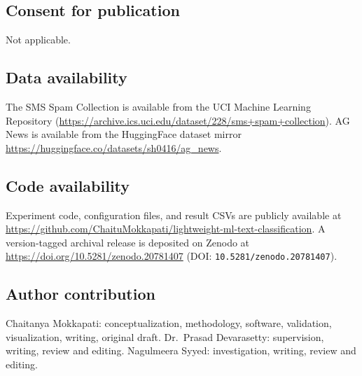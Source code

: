 \documentclass[pdflatex,sn-mathphys-num]{sn-jnl}
\begin{document}
\subsection*{Consent for publication}
Not applicable.

\subsection*{Data availability}
The SMS Spam Collection is available from the UCI Machine Learning Repository (\url{https://archive.ics.uci.edu/dataset/228/sms+spam+collection}). AG News is available from the HuggingFace dataset mirror \url{https://huggingface.co/datasets/sh0416/ag_news}.

\subsection*{Code availability}
Experiment code, configuration files, and result CSVs are publicly available at \url{https://github.com/ChaituMokkapati/lightweight-ml-text-classification}. A version-tagged archival release is deposited on Zenodo at \url{https://doi.org/10.5281/zenodo.20781407} (DOI: \texttt{10.5281/zenodo.20781407}).

\subsection*{Author contribution}
Chaitanya Mokkapati: conceptualization, methodology, software, validation, visualization, writing, original draft. Dr.\ Prasad Devarasetty: supervision, writing, review and editing. Nagulmeera Syyed: investigation, writing, review and editing.


\end{document}
